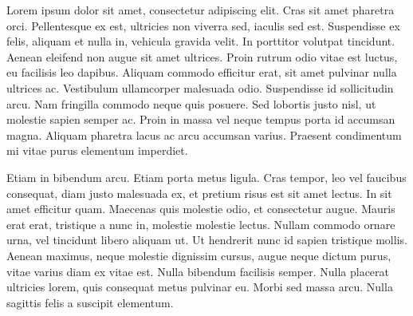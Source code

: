 \documentclass{zjureport}
\begin{document}
  Lorem ipsum dolor sit amet, consectetur adipiscing elit. Cras sit amet pharetra orci. Pellentesque ex est, ultricies non viverra sed, iaculis sed est. Suspendisse ex felis, aliquam et nulla in, vehicula gravida velit. In porttitor volutpat tincidunt. Aenean eleifend non augue sit amet ultrices. Proin rutrum odio vitae est luctus, eu facilisis leo dapibus. Aliquam commodo efficitur erat, sit amet pulvinar nulla ultrices ac. Vestibulum ullamcorper malesuada odio. Suspendisse id sollicitudin arcu. Nam fringilla commodo neque quis posuere. Sed lobortis justo nisl, ut molestie sapien semper ac. Proin in massa vel neque tempus porta id accumsan magna. Aliquam pharetra lacus ac arcu accumsan varius. Praesent condimentum mi vitae purus elementum imperdiet.

  Etiam in bibendum arcu. Etiam porta metus ligula. Cras tempor, leo vel faucibus consequat, diam justo malesuada ex, et pretium risus est sit amet lectus. In sit amet efficitur quam. Maecenas quis molestie odio, et consectetur augue. Mauris erat erat, tristique a nunc in, molestie molestie lectus. Nullam commodo ornare urna, vel tincidunt libero aliquam ut. Ut hendrerit nunc id sapien tristique mollis. Aenean maximus, neque molestie dignissim cursus, augue neque dictum purus, vitae varius diam ex vitae est. Nulla bibendum facilisis semper. Nulla placerat ultricies lorem, quis consequat metus pulvinar eu. Morbi sed massa arcu. Nulla sagittis felis a suscipit elementum.
\end{document}
